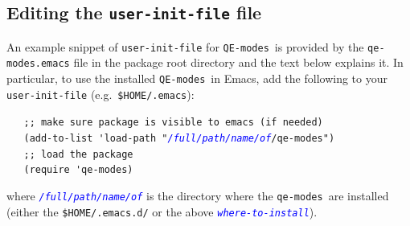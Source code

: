\documentclass[12pt,a4paper]{article}
\def\QEmodes{\texttt{QE-modes}}
\def\qemodes{\texttt{qe-modes}}
\def\var#1{\textcolor{Blue}{\texttt{\textit{#1}}}}
\begin{document}

\subsection{Editing the \texttt{user-init-file} file}

An example snippet of \texttt{user-init-file} for \QEmodes\ is
provided by the \texttt{qe-modes.emacs} file in the package root
directory and the text below explains it. In particular, to use the
installed \QEmodes\ in Emacs, add the following to your
\verb+user-init-file+ (e.g.\ \verb+$HOME/.emacs+):
\begin{flushleft}
{\color{red}
\verb+   ;; make sure package is visible to emacs (if needed)+}\\
\verb+   (add-to-list 'load-path "+\var{/full/path/name/of}\verb+/qe-modes")+\\[1em]
{\color{red}
\verb+   ;; load the package+}\\
\verb+   (require 'qe-modes)+
\end{flushleft}
where \var{/full/path/name/of} is the directory where the \qemodes\
are installed (either the \texttt{\$HOME/.emacs.d/} or the above
\var{where-to-install}).
\end{document}
